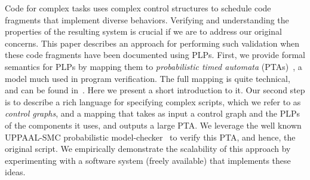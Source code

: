 \documentclass[letterpaper]{article}
\begin{document}
Code for complex tasks uses complex 
control structures to schedule
code fragments that implement diverse behaviors.
Verifying and understanding the properties of the resulting system
is crucial if we are to address  our original concerns. This paper describes an 
approach for performing such validation when these code fragments have been documented using PLPs.  First, we  provide formal semantics for PLPs by mapping them to \textit{probabilistic timed automata} (PTAs)~\citep{PTA}, a model much used in program verification. The full mapping is quite technical, and can be found in~\cite{kovalchu2018}. Here we present a short introduction to it.
Our second step is to describe a rich language for specifying complex scripts, which we refer to as {\em control graphs}, and a mapping that takes as input a control graph and the PLPs of the components it uses, and outputs a large PTA.
We leverage the well known 
UPPAAL-SMC probabilistic model-checker~\cite{UPPAAL-SMC} to  verify this PTA,
and hence, the original script.
We empirically demonstrate the scalability of this approach by experimenting
with a software system (freely available) that implements these ideas.


\end{document}
